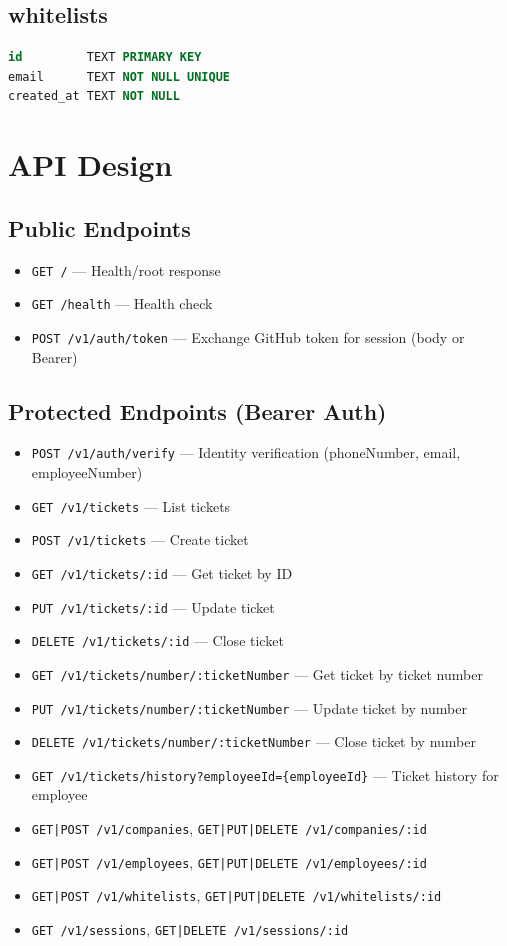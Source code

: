 \documentclass{article}
\begin{document}
\subsection{whitelists}
\begin{lstlisting}[language=SQL]
id         TEXT PRIMARY KEY
email      TEXT NOT NULL UNIQUE
created_at TEXT NOT NULL
\end{lstlisting}

\section{API Design}

\subsection{Public Endpoints}
\begin{itemize}[noitemsep]
  \item \texttt{GET /} --- Health/root response
  \item \texttt{GET /health} --- Health check
  \item \texttt{POST /v1/auth/token} --- Exchange GitHub token for session (body or Bearer)
\end{itemize}

\subsection{Protected Endpoints (Bearer Auth)}
\begin{itemize}[noitemsep]
  \item \texttt{POST /v1/auth/verify} --- Identity verification (phoneNumber, email, employeeNumber)
  \item \texttt{GET /v1/tickets} --- List tickets
  \item \texttt{POST /v1/tickets} --- Create ticket
  \item \texttt{GET /v1/tickets/:id} --- Get ticket by ID
  \item \texttt{PUT /v1/tickets/:id} --- Update ticket
  \item \texttt{DELETE /v1/tickets/:id} --- Close ticket
  \item \texttt{GET /v1/tickets/number/:ticketNumber} --- Get ticket by ticket number
  \item \texttt{PUT /v1/tickets/number/:ticketNumber} --- Update ticket by number
  \item \texttt{DELETE /v1/tickets/number/:ticketNumber} --- Close ticket by number
  \item \texttt{GET /v1/tickets/history?employeeId=\{employeeId\}} --- Ticket history for employee
  \item \texttt{GET|POST /v1/companies}, \texttt{GET|PUT|DELETE /v1/companies/:id}
  \item \texttt{GET|POST /v1/employees}, \texttt{GET|PUT|DELETE /v1/employees/:id}
  \item \texttt{GET|POST /v1/whitelists}, \texttt{GET|PUT|DELETE /v1/whitelists/:id}
  \item \texttt{GET /v1/sessions}, \texttt{GET|DELETE /v1/sessions/:id}
\end{itemize}
\end{document}
